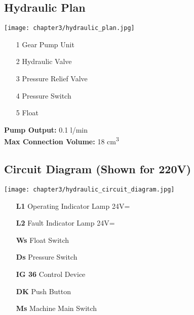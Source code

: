 

\subsection*{Hydraulic Plan}

\begin{minipage}{0.65\textwidth}
    \texttt{[image: chapter3/hydraulic\_plan.jpg]}
\end{minipage}%
\begin{minipage}{0.35\textwidth}
    \begin{itemize}
        \item[1] Gear Pump Unit
        \item[2] Hydraulic Valve
        \item[3] Pressure Relief Valve
        \item[4] Pressure Switch
        \item[5] Float
    \end{itemize}
    
    \vspace{1em}
    \textbf{Pump Output:} 0.1 l/min \\
    \textbf{Max Connection Volume:} 18 cm\textsuperscript{3}
\end{minipage}

\vspace{2cm}

\subsection*{Circuit Diagram (Shown for 220V)}

\begin{minipage}{0.65\textwidth}
    \texttt{[image: chapter3/hydraulic\_circuit\_diagram.jpg]}
\end{minipage}%
\begin{minipage}{0.35\textwidth}
    \begin{itemize}
        \item[\textbf{L1}] Operating Indicator Lamp 24V=
        \item[\textbf{L2}] Fault Indicator Lamp 24V=
        \item[\textbf{Ws}] Float Switch
        \item[\textbf{Ds}] Pressure Switch
        \item[\textbf{IG 36}] Control Device
        \item[\textbf{DK}] Push Button
        \item[\textbf{Ms}] Machine Main Switch
    \end{itemize}
\end{minipage}


